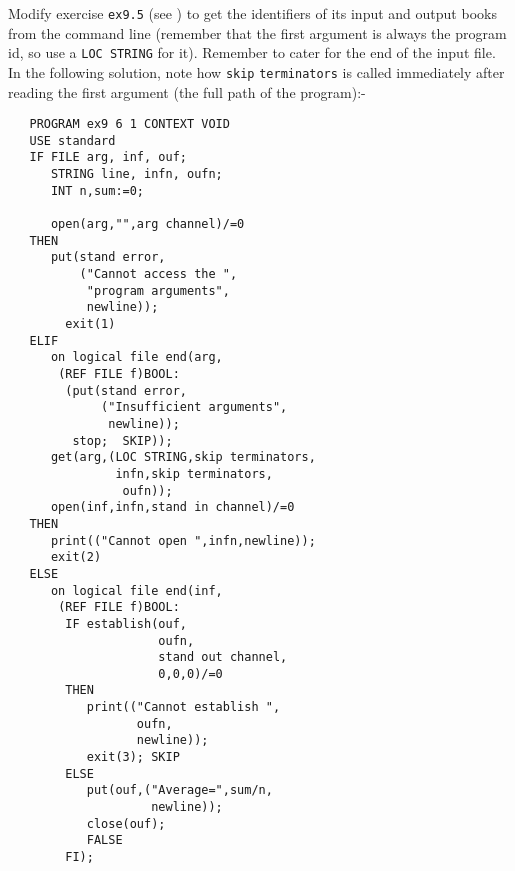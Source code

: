 \begin{exercise}
\item Modify exercise \verb|ex9.5| (see ) to
get the identifiers of its input and output books from the command
line (remember that the first argument is always the program id, so
use a \verb|LOC STRING| for it).  Remember to cater for the end of
the input file. \ans In the following solution, note how
\texttt{skip} \texttt{term\-in\-ators} is called immediately after
reading the first argument (the full path of the program):-
\begin{verbatim}
   PROGRAM ex9 6 1 CONTEXT VOID
   USE standard
   IF FILE arg, inf, ouf;
      STRING line, infn, oufn;
      INT n,sum:=0;

      open(arg,"",arg channel)/=0
   THEN
      put(stand error,
          ("Cannot access the ",
           "program arguments",
           newline));
        exit(1)
   ELIF
      on logical file end(arg,
       (REF FILE f)BOOL:
        (put(stand error,
             ("Insufficient arguments",
              newline));
         stop;  SKIP));
      get(arg,(LOC STRING,skip terminators,
               infn,skip terminators,
                oufn));
      open(inf,infn,stand in channel)/=0
   THEN
      print(("Cannot open ",infn,newline));
      exit(2)
   ELSE
      on logical file end(inf,
       (REF FILE f)BOOL:
        IF establish(ouf,
                     oufn,
                     stand out channel,
                     0,0,0)/=0
        THEN
           print(("Cannot establish ",
                  oufn,
                  newline));
           exit(3); SKIP
        ELSE
           put(ouf,("Average=",sum/n,
                    newline));
           close(ouf);
           FALSE
        FI);


\end{verbatim}
\end{exercise}

